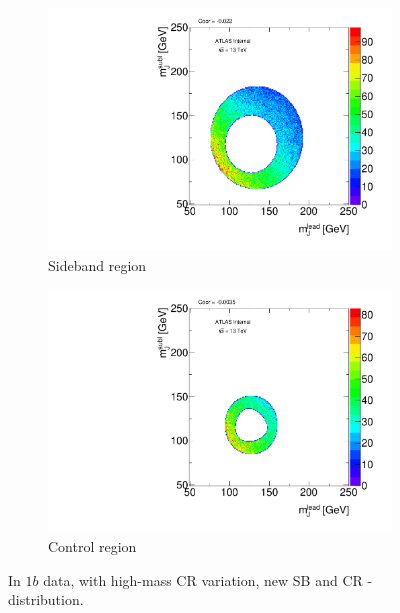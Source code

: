 \begin{figure}[htbp!]
\centering
\captionsetup{justification=centering}
    \begin{subfigure}[b]{0.39\textwidth}
        \includegraphics[width=\textwidth,angle=-90]{figures/boosted/Syst_CRSB/CR_High_Sideband_OneTag_mH0H1.pdf}
        \caption{Sideband region}
        \label{CRSB:CR_High_SB}
    \end{subfigure}
    \quad
    \begin{subfigure}[b]{0.39\textwidth}
        \includegraphics[width=\textwidth,angle=-90]{figures/boosted/Syst_CRSB/CR_High_Control_OneTag_mH0H1.pdf}
        \caption{Control region}
        \label{CRSB:CR_High_CR}
    \end{subfigure}
\caption{In $1b$ data, with high-mass CR variation, new SB and CR \mleadJ-\msublJ distribution.}
\label{CRSB:CR_High}
\end{figure}

